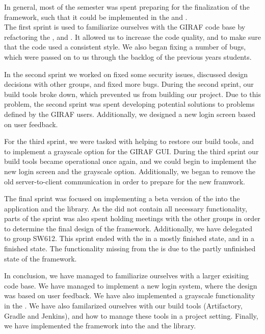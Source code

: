 In general, most of the semester was spent preparing for the finalization of the
 framework, such that it could be implemented in the
 and .\\
The first sprint is used to familiarize ourselves with the GIRAF code base by
refactoring the ,  and
. It allowed us to increase the code quality, and to make
sure that the code used a consistent style. We also began fixing a number of
bugs, which were passed on to us through the backlog of the previous years
students.\nl



In the second sprint we worked on fixed some security issues, discussed design
decisions with other groups, and fixed more bugs. During the second sprint, our
build tools broke down, which prevented us from building our project. Due to
this problem, the second sprint was spent developing potential solutions to
problems defined by the GIRAF users. Additionally, we designed a new login
screen based on user feedback.\nl

For the third sprint, we were tasked with helping to restore our build tools,
and to implement a grayscale option for the GIRAF GUI. During the third sprint
our build tools became operational once again, and we could begin to implement
the new login screen and the grayscale option. Additionally, we began to remove
the old server-to-client communication in order to prepare for the new
 framwork.\nl

The final sprint was focused on implementing a beta version of the
 into the  application and the
 library. As the  did not
contain all necessary functionality, parts of the sprint was also spent holding
meetings with the other groups in order to determine the final design of the
 framework. Additionally, we have delegated 
to group SW612. This sprint ended with the  in a mostly finished
state, and  in a finished state. The functionality
missing from the  is due to the partly unfinished state of the
 framework.\nl

In conclusion, we have managed to familiarize ourselves with a larger exisiting
code base. We have managed to implement a new login system, where the design was
based on user feedback. We have also implemented a grayscale
functionality in the . We have also familarized ourselves
with our build tools (Artifactory, Gradle and Jenkins), and how to manage these tools in
a project setting. Finally, we have implemented the  framework into
the  and the  library.
